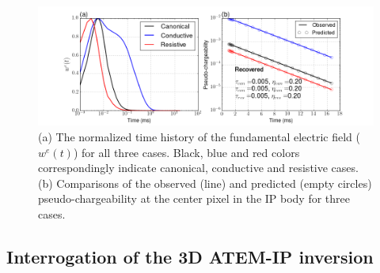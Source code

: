 \documentclass[a4paper, 11pt]{article}
\begin{document}
\begin{figure}[htb]
  \centering  \includegraphics[width=1.0\textwidth]{figures/threecasesresp/wepetathree.png}
  \caption{(a) The normalized time history of the fundamental electric field ($w^e(t)$) for all three cases. Black, blue and red colors correspondingly indicate canonical, conductive and resistive cases. (b) Comparisons of the observed (line) and predicted (empty circles) pseudo-chargeability at the center pixel in the IP body for three cases.}
  \label{F:wepetathree}
\end{figure}
\subsection{Interrogation of the 3D ATEM-IP inversion}
\end{document}
